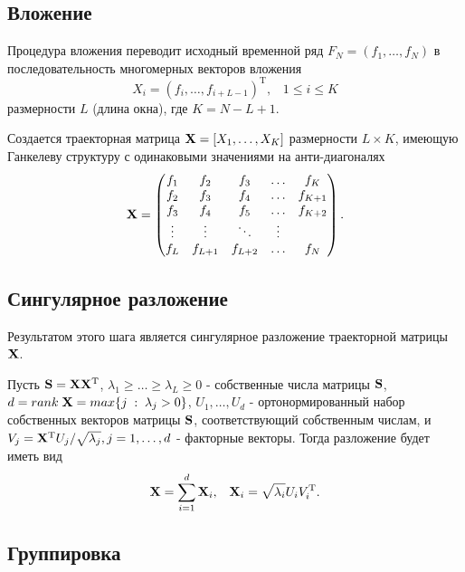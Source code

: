 \documentclass[specialist, substylefile = spbu.rtx,
			   subf, href, 12pt]{disser}
\begin{document}
\subsection{Вложение}
\label{step:Embedding}

Процедура вложения переводит исходный временной ряд $F_N = (f_1, \dotsc, f_{N})$ в последовательность многомерных векторов вложения
$$X_i = (f_{i}, \dotsc, f_{i+L-1})^\mathrm{T}, \;\;\; 1 \leq i \leq K$$
размерности $L$ (длина окна), где $K = N - L + 1$. 

Создается траекторная матрица $\bold{X} = [X_1, \dotsc, X_K]$ размерности $L \times K$, имеющую Ганкелеву структуру с одинаковыми значениями на анти-диагоналях
\begin{equation}\label{eq:traj_m}
	\bold{X} =
	\begin{pmatrix}
		f_{1} & f_{2} & f_{3} & \ldots & f_{K}\\
		f_{2} & f_{3} & f_{4} & \ldots & f_{K+1}\\
		f_{3} & f_{4} & f_{5} & \ldots & f_{K+2}\\
		\vdots & \vdots & \ddots & \vdots\\
		f_{L} & f_{L+1} & f_{L+2} & \ldots & f_{N}
	\end{pmatrix}.
\end{equation}

\subsection{Сингулярное разложение}

Результатом этого шага является сингулярное разложение траекторной матрицы $\bold{X}$. 

Пусть $\bold{S} = \bold{X}\bold{X}^\mathrm{T}$, $\lambda_1 \geq \dotsc \geq \lambda_L \geq 0$ - собственные числа матрицы $\bold{S}$, $d = rank\;\bold{X} = max\{j\;:\;\lambda_j > 0\}$, $U_1, \dotsc, U_d$ - ортонормированный набор собственных векторов матрицы $\bold{S}$, соответствующий собственным числам, и $V_j = \bold{X}^\mathrm{T}U_j/\sqrt{\lambda_j}, j = 1, \dotsc, d$ - факторные векторы. Тогда разложение будет иметь вид
\begin{equation}\label{eq:singular_decomp}
	\bold{X} = \sum\limits_{i=1}^{d}\bold{X}_i, \;\;\; \bold{X}_i = \sqrt{\lambda_i}U_iV_i^\mathrm{T}. 
\end{equation}

\subsection{Группировка}
\end{document}
